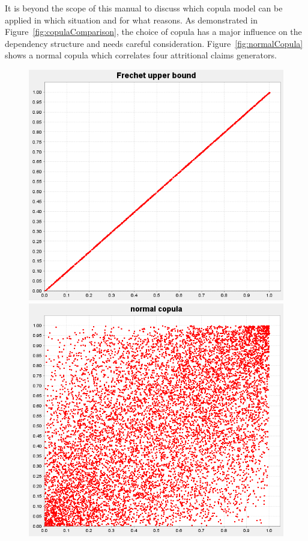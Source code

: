It is beyond the scope of this manual to discuss which copula model can be applied in which situation and for what reasons. As demonstrated in Figure~\ref{fig:copulaComparison}, the choice of copula has a major influence on the dependency structure and needs careful consideration.
Figure~\ref{fig:normalCopula} shows a normal copula which correlates four attritional claims generators.

\begin{figure}
		\centering
		\includegraphics[scale=0.3]{images/FrechetUpperBoundSample.png}		
		\includegraphics[scale=0.29]{images/normalCopulaSample.png}

\end{figure}
